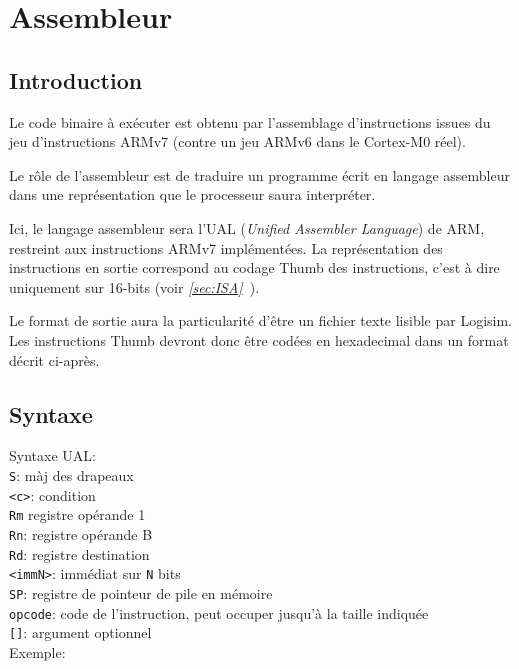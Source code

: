 \documentclass{article}
\begin{document}
    \section{Assembleur}
    \label{sec:ASM}

    \subsection{Introduction}

    Le code binaire à exécuter est obtenu par l'assemblage d'instructions issues du jeu d'instructions ARMv7 (contre un jeu ARMv6 dans le Cortex-M0 réel).

    Le rôle de l'assembleur est de traduire un programme écrit en langage assembleur dans une représentation que le processeur saura interpréter.

    Ici, le langage assembleur sera l'UAL (\textit{Unified Assembler Language}) de ARM, restreint aux instructions ARMv7 implémentées.
    La représentation des instructions en sortie correspond au codage Thumb des instructions, c'est à dire uniquement sur 16-bits (voir \textit{\ref{sec:ISA}~}).

    Le format de sortie aura la particularité d'être un fichier texte lisible par Logisim.
    Les instructions Thumb devront donc être codées en hexadecimal dans un format décrit ci-après.

    \subsection{Syntaxe}
    Syntaxe UAL:\\
    \texttt{S}: màj des drapeaux\\
    \texttt{<c>}: condition\\
    \texttt{Rm} registre opérande 1\\
    \texttt{Rn}: registre opérande B\\
    \texttt{Rd}: registre destination\\
    \texttt{<immN>}: immédiat sur \texttt{N} bits\\
    \texttt{SP}: registre de pointeur de pile en mémoire\\
    \texttt{opcode}: code de l'instruction, peut occuper jusqu'à la taille indiquée\\
    \texttt{[]}: argument optionnel\\

    Exemple:
\end{document}
